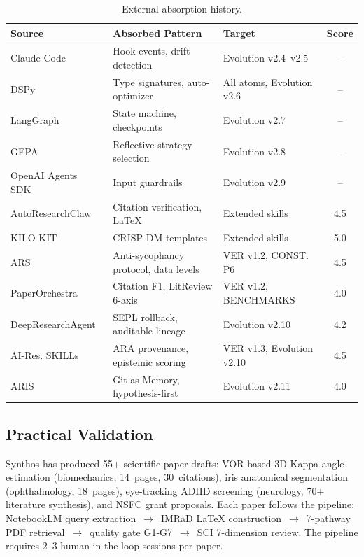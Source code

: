 \documentclass[review]{elsarticle}
\begin{document}
\begin{table}[h]\centering\caption{External absorption history.}\label{tab:absorption}
\footnotesize
\begin{tabular}{l>{\raggedright\arraybackslash}p{3.2cm}>{\raggedright\arraybackslash}p{3.5cm}c}\toprule
\textbf{Source} & \textbf{Absorbed Pattern} & \textbf{Target} & \textbf{Score}\\\midrule
Claude Code~\cite{anthropic2025claude} & Hook events, drift detection & Evolution v2.4--v2.5 & --\\
DSPy~\cite{khattab2023dspy} & Type signatures, auto-optimizer & All atoms, Evolution v2.6 & --\\
LangGraph~\cite{langchain2024langgraph} & State machine, checkpoints & Evolution v2.7 & --\\
GEPA~\cite{gepa2025gepa} & Reflective strategy selection & Evolution v2.8 & --\\
OpenAI Agents SDK~\cite{openai2025agents} & Input guardrails & Evolution v2.9 & --\\
AutoResearchClaw~\cite{aiming2025claw} & Citation verification, LaTeX & Extended skills & 4.5\\
KILO-KIT~\cite{vo2025kilo} & CRISP-DM templates & Extended skills & 5.0\\
ARS~\cite{ars2025academic} & Anti-sycophancy protocol, data levels & VER v1.2, CONST. P6 & 4.5\\
PaperOrchestra~\cite{song2026paperorchestra} & Citation F1, LitReview 6-axis & VER v1.2, BENCHMARKS & 4.0\\
DeepResearchAgent~\cite{skyworkai2026deep} & SEPL rollback, auditable lineage & Evolution v2.10 & 4.2\\
AI-Res. SKILLs~\cite{orchestra2026airesearch} & ARA provenance, epistemic scoring & VER v1.3, Evolution v2.10 & 4.5\\
ARIS~\cite{haiyang2025aris} & Git-as-Memory, hypothesis-first & Evolution v2.11 & 4.0\\\bottomrule
\end{tabular}\end{table}

\subsection{Practical Validation}

Synthos has produced 55+ scientific paper drafts: VOR-based 3D Kappa angle estimation (biomechanics, 14~pages, 30~citations), iris anatomical segmentation (ophthalmology, 18~pages), eye-tracking ADHD screening (neurology, 70+ literature synthesis), and NSFC grant proposals. Each paper follows the pipeline: NotebookLM query extraction~$\rightarrow$~IMRaD LaTeX construction~$\rightarrow$~7-pathway PDF retrieval~$\rightarrow$~quality gate G1-G7~$\rightarrow$~SCI 7-dimension review. The pipeline requires 2--3 human-in-the-loop sessions per paper.
\end{document}
